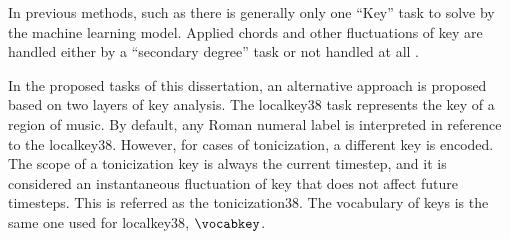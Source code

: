 
In previous methods, such as \textcite{chen2018functional,
chen2019harmony, micchi2020not, micchi2021deep,
mcleod2021modular} there is generally only one ``Key'' task
to solve by the machine learning model. Applied chords and
other fluctuations of key are handled either by a
``secondary degree'' task \parencite{chen2021attend,
micchi2021deep} or not handled at all
\parencite{mcleod2021modular}.

In the proposed tasks of this dissertation, an alternative
approach is proposed based on two layers of key analysis.
The \gls{localkey38} task represents the key of a region of
music. By default, any Roman numeral label is interpreted in
reference to the \gls{localkey38}. However, for cases of
tonicization, a different key is encoded. The scope of a
tonicization key is always the current timestep, and it is
considered an instantaneous fluctuation of key that does not
affect future timesteps. This is referred as the
\gls{tonicization38}. The vocabulary of keys is the same one
used for \gls{localkey38}, $\vocabkey$.
